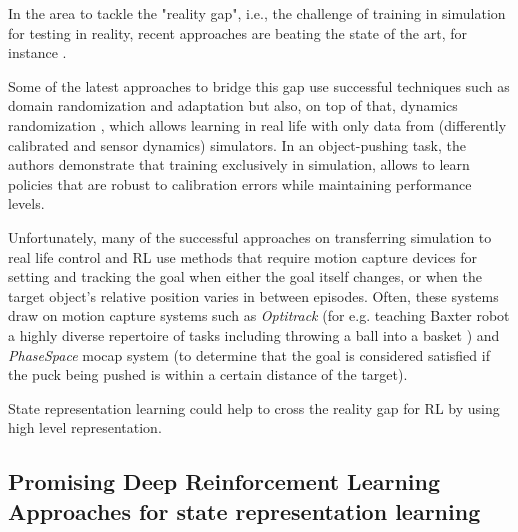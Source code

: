 \documentclass[a4paper]{article}
\begin{document}
In the area to tackle the "reality gap", i.e., the challenge of training in simulation for testing in reality, recent approaches are beating the state of the art, for instance \cite{Peng17}.%



Some of the latest approaches to bridge this gap use successful techniques such as domain randomization \cite{Tobin17} and adaptation \cite{Bousmalis17} but also, on top of that, dynamics randomization \cite{Peng17}, which allows learning in real life with only data from (differently calibrated and sensor dynamics) simulators. In an object-pushing task, the authors demonstrate that training exclusively in simulation, allows to learn policies that are robust to calibration errors while maintaining performance levels.

Unfortunately, many of the successful approaches on transferring simulation to real life control and RL use methods that require motion capture devices for setting and tracking the goal when either the goal itself changes, or when the target object's relative position varies in between episodes. Often, these systems draw on motion capture systems such as \textit{Optitrack} (for e.g. teaching Baxter robot a highly diverse repertoire of tasks including throwing a ball into a basket \cite{Kim17}) and \textit{PhaseSpace} mocap system \cite{Peng17} (to determine that the goal is considered satisfied if the puck being pushed is within a certain distance of the target).

State representation learning could help to cross the reality gap for RL by using high level representation.

\subsection{Promising Deep Reinforcement Learning Approaches for state representation learning}
\end{document}

